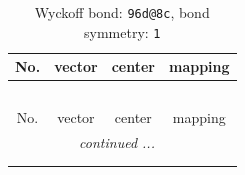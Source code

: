 \documentclass[fleqn,8pt]{jsarticle}
\begin{document}
\renewcommand{\arraystretch}{1.2}
\begin{longtable}{cccc}
\caption{Wyckoff bond: {\tt 96d@8c}, bond symmetry: {\tt 1}}
 \\
 \hline \hline
No. & vector & center & mapping \\ \hline \endfirsthead

\multicolumn{3}{l}{\tablename\ \thetable{}} \\
 \hline \hline
No. & vector & center & mapping \\ \hline \endhead

 \hline \hline
\multicolumn{3}{r}{\footnotesize\it continued ...} \\ \endfoot

 \hline \hline
\multicolumn{3}{r}{} \\ \endlastfoot


\end{longtable}
\end{document}
